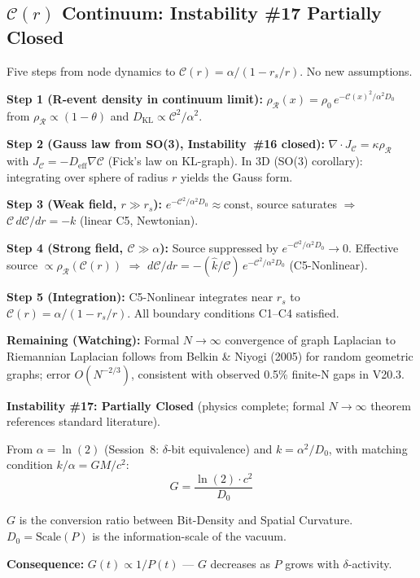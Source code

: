 \documentclass[12pt, a4paper]{article}
\begin{document}
\subsection{$\mathcal{C}(r)$ Continuum: Instability \#17 Partially Closed}

\begin{derivedbox}[title={From Discrete $\delta$-Chain to Schwarzschild: Gauss Law Bridge (CRF\_C\_r\_Continuum)}]
Five steps from node dynamics to $\mathcal{C}(r) = \alpha/(1 - r_s/r)$. No new assumptions.

\textbf{Step 1 (R-event density in continuum limit):}
$\rho_\mathcal{R}(x) = \rho_0\,e^{-\mathcal{C}(x)^2/\alpha^2 D_0}$
from $\rho_\mathcal{R} \propto (1-\theta)$ and $D_{\mathrm{KL}} \propto \mathcal{C}^2/\alpha^2$.

\textbf{Step 2 (Gauss law from SO(3), Instability~\#16 closed):}
$\nabla\cdot J_\mathcal{C} = \kappa\rho_\mathcal{R}$ with
$J_\mathcal{C} = -D_{\mathrm{eff}}\nabla\mathcal{C}$ (Fick's law on KL-graph).
In 3D (SO(3) corollary): integrating over sphere of radius $r$ yields the Gauss form.

\textbf{Step 3 (Weak field, $r \gg r_s$):} $e^{-\mathcal{C}^2/\alpha^2 D_0} \approx \mathrm{const}$,
source saturates $\Rightarrow$ $\mathcal{C}\,d\mathcal{C}/dr = -k$ (linear C5, Newtonian).

\textbf{Step 4 (Strong field, $\mathcal{C} \gg \alpha$):} Source suppressed by
$e^{-\mathcal{C}^2/\alpha^2 D_0} \to 0$. Effective source $\propto \rho_\mathcal{R}(\mathcal{C}(r))$
$\Rightarrow$ $d\mathcal{C}/dr = -(\hat{k}/\mathcal{C})\,e^{-\mathcal{C}^2/\alpha^2 D_0}$
(C5-Nonlinear).

\textbf{Step 5 (Integration):} C5-Nonlinear integrates near $r_s$ to
$\mathcal{C}(r) = \alpha/(1 - r_s/r)$. All boundary conditions C1--C4 satisfied.

\textbf{Remaining (Watching):} Formal $N\to\infty$ convergence of graph Laplacian to
Riemannian Laplacian follows from Belkin \& Niyogi (2005) for random geometric graphs;
error $O(N^{-2/3})$, consistent with observed 0.5\% finite-N gaps in V20.3.

\textbf{Instability \#17: Partially Closed} (physics complete; formal $N\to\infty$
theorem references standard literature).
\end{derivedbox}



\begin{derivedbox}[title={$G$ from $\delta$ --- No Free Parameter of Gravity Remains}]
From $\alpha = \ln(2)$ (Session~8: $\delta$-bit equivalence) and $k = \alpha^2/D_0$,
with matching condition $k/\alpha = GM/c^2$:
\[
  \boxed{G = \frac{\ln(2)\cdot c^2}{D_0}}
\]

$G$ is the conversion ratio between Bit-Density and Spatial Curvature. $D_0 =
\mathrm{Scale}(P)$ is the information-scale of the vacuum.

\textbf{Consequence:} $G(t) \propto 1/P(t)$ --- $G$ decreases as $P$ grows with
$\delta$-activity.
\end{derivedbox}
\end{document}
